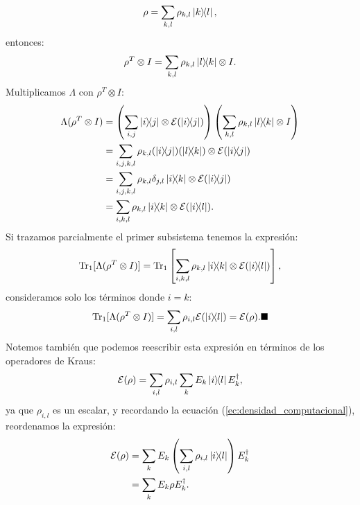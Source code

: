 \documentclass[letterpaper,12pt]{thesisECFM}
\theoremstyle{plain}
\theoremstyle{definition}
\theoremstyle{definition}
\theoremstyle{remark}
\newcommand{\1}{\mathbb{1}}
\begin{document}
\begin{enumerate}
\begin{equation}
            \rho = \sum_{k, l} \rho_{k, l} \ketbra{k}{l},
        \end{equation}
        entonces:
        \begin{equation}
            \rho^{T} \otimes I = \sum_{k, l} \rho_{k, l} \ketbra{l}{k} \otimes I.
        \end{equation}
        Multiplicamos $\Lambda$ con $\rho^{T} \otimes I$:
        \begin{align}
            \Lambda(\rho^{T} \otimes I) & = \left(\sum_{i, j} \ketbra{i}{j} \otimes \mathcal{E}(\ketbra{i}{j}) \right) \left(\sum_{k, l} \rho_{k, l} \ketbra{l}{k} \otimes I \right) \\
            & = \sum_{i, j, k, l} \rho_{k, l} ( \ketbra{i}{j}) (\ketbra{l}{k}) \otimes \mathcal{E} (\ketbra{i}{j})\\
            & =  \sum_{i, j, k, l} \rho_{k, l} \delta_{j, l} \ketbra{i}{k} \otimes \mathcal{E}(\ketbra{i}{j})\\
            & = \sum_{i, k, l} \rho_{k, l} \ketbra{i}{k} \otimes \mathcal{E}(\ketbra{i}{l}).
        \end{align}
        Si trazamos parcialmente el primer subsistema tenemos la expresión: 
        \begin{equation}
            \text{Tr}_1 [ \Lambda (\rho^{T} \otimes I)]  = \text{Tr}_1 \left[  \sum_{i, k, l} \rho_{k, l}\ketbra{i}{k} \otimes \mathcal{E}(\ketbra{i}{l})\right],
        \end{equation}
        consideramos solo los términos donde $i=k$:
        \begin{equation}
            \text{Tr}_1 [ \Lambda (\rho^{T} \otimes I)]  = \sum_{i, l}\rho_{i, l} \mathcal{E}(\ketbra{i}{l}) = \mathcal{E}(\rho).\blacksquare
        \end{equation}
        Notemos también  que podemos reescribir esta expresión en términos de los operadores de Kraus:
        \begin{equation}
            \mathcal{E}(\rho) = \sum_{i, l} \rho_{i, l} \sum_k E_k \ketbra{i}{l}E_k^{\dagger},
        \end{equation}
        ya que $\rho_{i, l}$ es un escalar, y recordando la ecuación (\ref{ec:densidad_computacional}), reordenamos la expresión: 
        \begin{align}
            \mathcal{E}(\rho)& = \sum_k E_k \left(\sum_{i, l}\rho_{i, l}\ketbra{i}{l}\right) E_k^{\dagger}\\
            & = \sum_k E_k \rho E_k^{\dagger}.
        \end{align}



\end{enumerate}
\end{document}
